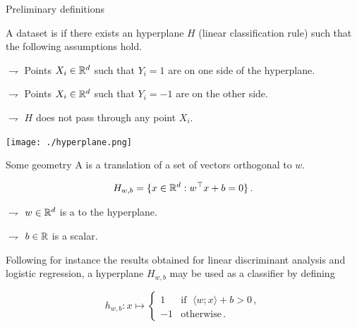 \documentclass[xcolor={usenames,dvipsnames}]{beamer}
\begin{document}



  \begin{frame}{Preliminary definitions}
  
A dataset is  if \alert{there exists an hyperplane $H$} (linear classification rule) such that the following assumptions hold.

\vspace{.2cm}

$\rightharpoondown$ Points $X_i \in \mathbb{R}^d$ such that\alert{ $Y_i = 1$ are on one side of the hyperplane}.

\vspace{.1cm}

$\rightharpoondown$ Points $X_i \in \mathbb{R}^d$ such that \alert{$Y_i = -1$ are on the other side}.

\vspace{.1cm}

$\rightharpoondown$ $H$ \alert{does not pass through any point $X_i$}.


\begin{center}
\texttt{[image: ./hyperplane.png]}
\end{center}
\end{frame}



\begin{frame}{Some geometry}
A  is a translation of a set of vectors orthogonal to $w$.

\begin{align*}
H_{w,b}= \{ x \in \mathbb{R}^d : w^\top x + b = 0 \}\,.
\end{align*}

\vspace{.2cm}

$\rightharpoondown$ $w \in \mathbb{R}^d$ is a  to the hyperplane.

$\rightharpoondown$ $b \in \mathbb{R}$ is a scalar. 

\vspace{.5cm}

Following for instance the results obtained for linear discriminant analysis and logistic regression, a \alert{ hyperplane $H_{w,b}$ may be used as a classifier} by defining

\vspace{.2cm}

\[
h_{w,b}: x \mapsto \left\{
    \begin{array}{ll}
       1 & \mbox{if }\;  \langle w; x\rangle + b >0\,, \\
        -1 & \mbox{otherwise}\,.
    \end{array}
\right.
\]
\end{frame}
\end{document}
